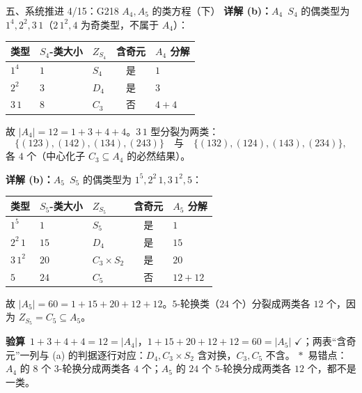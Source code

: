 \documentclass[aspectratio=169,10pt,fontset=none]{ctexbeamer}
\newcommand{\key}[1]{\textcolor{ink}{\bfseries #1}}
\newcommand{\starpt}{\textcolor{accent}{\bfseries$\ast$}}
\begin{document}
\begin{frame}[t]{五、系统推进 4/15：G218 $A_4,A_5$ 的类方程（下）}
\scriptsize
\key{详解 (b)：$A_4$}\ $S_4$ 的偶类型为 $1^4,2^2,3\,1$（$2\,1^2,4$ 为奇类型，不属于 $A_4$）：
\renewcommand{\arraystretch}{0.82}
\begin{center}
\begin{tabular}{@{}lllcl@{}}
\toprule
类型 & $S_4$-类大小 & $Z_{S_4}$ & 含奇元 & $A_4$ 分解\\
\midrule
$1^4$ & $1$ & $S_4$ & 是 & $1$\\
$2^2$ & $3$ & $D_4$ & 是 & $3$\\
$3\,1$ & $8$ & $C_3$ & 否 & $4+4$\\
\bottomrule
\end{tabular}
\end{center}
故 $|A_4|=12=1+3+4+4$。$3\,1$ 型分裂为两类：
\[
\{(123),(142),(134),(243)\}\quad\text{与}\quad\{(132),(124),(143),(234)\},
\]
各 $4$ 个（中心化子 $C_3\subseteq A_4$ 的必然结果）。

\key{详解 (b)：$A_5$}\ $S_5$ 的偶类型为 $1^5,2^2\,1,3\,1^2,5$：
\begin{center}
\begin{tabular}{@{}lllcl@{}}
\toprule
类型 & $S_5$-类大小 & $Z_{S_5}$ & 含奇元 & $A_5$ 分解\\
\midrule
$1^5$ & $1$ & $S_5$ & 是 & $1$\\
$2^2\,1$ & $15$ & $D_4$ & 是 & $15$\\
$3\,1^2$ & $20$ & $C_3\times S_2$ & 是 & $20$\\
$5$ & $24$ & $C_5$ & 否 & $12+12$\\
\bottomrule
\end{tabular}
\end{center}
故 $|A_5|=60=1+15+20+12+12$。$5$-轮换类（$24$ 个）分裂成两类各 $12$ 个，因为 $Z_{S_5}=C_5\subseteq A_5$。

\key{验算}\ $1+3+4+4=12=|A_4|$，$1+15+20+12+12=60=|A_5|$ $\checkmark$；两表“含奇元”一列与 (a) 的判据逐行对应：$D_4,C_3\times S_2$ 含对换，$C_3,C_5$ 不含。
\starpt\ 易错点：$A_4$ 的 $8$ 个 $3$-轮换分成两类各 $4$ 个；$A_5$ 的 $24$ 个 $5$-轮换分成两类各 $12$ 个，都不是一类。
\end{frame}
\end{document}
